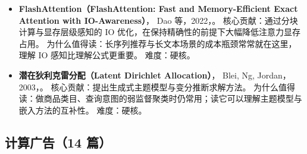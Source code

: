 \begin{itemize}
        为什么值得读：只要做生成式产品就必须面对幻觉，这篇综述给出了可直接落地的评测维度。
        难度：入门。
  \item \textbf{FlashAttention（FlashAttention: Fast and Memory-Efficient Exact Attention with IO-Awareness）}，
        Dao 等，2022，\cite{dao2022flashattention}。
        核心贡献：通过分块计算与显存层级感知的 IO 优化，在保持精确性的前提下大幅降低注意力显存占用。
        为什么值得读：长序列推荐与长文本场景的成本瓶颈常常就在这里，理解 IO 感知比理解公式更重要。
        难度：硬核。
  \item \textbf{潜在狄利克雷分配（Latent Dirichlet Allocation）}，
        Blei, Ng, Jordan，2003，\cite{blei2003lda}。
        核心贡献：提出生成式主题模型与变分推断求解方法。
        为什么值得读：做商品类目、查询意图的弱监督聚类时仍常用；读它可以理解主题模型与嵌入方法的互补性。
        难度：硬核。
\end{itemize}

\subsection{计算广告（14 篇）}


